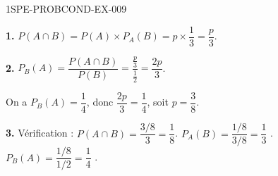 \begin{corrige}{1SPE-PROBCOND-EX-009}

\textbf{1.} $P(A \cap B) = P(A) \times P_A(B) = p \times \dfrac{1}{3} = \dfrac{p}{3}$.

\medskip
\textbf{2.} $P_B(A) = \dfrac{P(A \cap B)}{P(B)} = \dfrac{\frac{p}{3}}{\frac{1}{2}} = \dfrac{2p}{3}$.

On a $P_B(A) = \dfrac{1}{4}$, donc $\dfrac{2p}{3} = \dfrac{1}{4}$, soit $p = \dfrac{3}{8}$.

\medskip
\textbf{3.} Vérification : $P(A \cap B) = \dfrac{3/8}{3} = \dfrac{1}{8}$. $P_A(B) = \dfrac{1/8}{3/8} = \dfrac{1}{3}$ \checkmark. $P_B(A) = \dfrac{1/8}{1/2} = \dfrac{1}{4}$ \checkmark.

\end{corrige}
